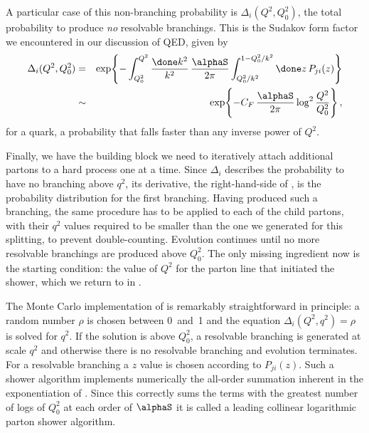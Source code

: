 A particular case of this non-branching probability is
$\Delta_i(Q^2,Q_0^2)$, the total probability to produce \emph{no\/}
resolvable branchings.  This is the Sudakov form factor we encountered in
our discussion of QED, given by
\begin{eqnarray}
  \label{exponentiation}
  \Delta_i(Q^2,Q_0^2) &=& \exp\Biggl\{-\int_{Q_0^2}^{Q^2}\frac{\done k^2}{k^2}\,
  \frac{\alphaS}{2\pi} \int_{Q_0^2/k^2}^{1-Q_0^2/k^2}\done z\,P_{ji}(z)
  \Biggr\} \\
  &\sim& \exp\Biggl\{-C_F\,\frac{\alphaS}{2\pi}\log^2\frac{Q^2}{Q_0^2}
  \Biggr\}\,,
\end{eqnarray}
for a quark, a probability that falls faster than any inverse power of
$Q^2$.

Finally, we have the building block we need to iteratively attach
additional partons to a hard process one at a time.  Since $\Delta_i$
describes the probability to have no branching above $q^2$, its
derivative, the right-hand-side of , is the
probability distribution for the first branching.  Having produced such
a branching, the same procedure has to be applied to each of the child
partons, with their $q^2$ values required to be smaller than the one we
generated for this splitting, to prevent double-counting.  Evolution
continues until no more resolvable branchings are produced above $Q_0^2$.
The only missing ingredient now is the starting condition: the value of
$Q^2$ for the parton line that initiated the shower, which we return to
in .

The Monte Carlo implementation of  is remarkably
straightforward in principle: a random number $\rho$ is chosen between
0~and~1 and the equation $\Delta_i(Q^2,q^2)=\rho$ is solved for $q^2$.  If
the solution is above $Q_0^2$, a resolvable branching is generated at scale
$q^2$ and otherwise there is no resolvable branching and evolution
terminates.  For a resolvable branching a $z$ value is chosen according to
$P_{ji}(z)$.  Such a shower algorithm implements numerically the all-order
summation inherent in the exponentiation of .
Since this correctly sums the terms with the greatest number of logs of
$Q_0^2$ at each order of $\alphaS$ it is called a leading collinear
logarithmic parton shower algorithm.

